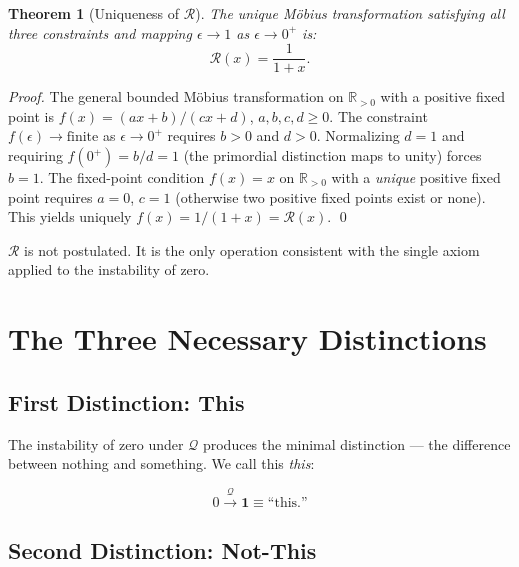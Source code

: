 \documentclass[11pt]{article}
\newtheorem{theorem}{Theorem}
\begin{document}
\begin{theorem}[Uniqueness of $\mathcal{R}$]
  The unique M\"{o}bius transformation satisfying all three constraints
  and mapping $\epsilon\to 1$ as $\epsilon\to 0^+$ is:
  \begin{equation}
    \boxed{\mathcal{R}(x) = \frac{1}{1+x}.}
  \end{equation}
\end{theorem}

\begin{proof}
  The general bounded M\"{o}bius transformation on $\mathbb{R}_{>0}$
  with a positive fixed point is $f(x)=(ax+b)/(cx+d)$,
  $a,b,c,d\geq0$. The constraint $f(\epsilon)\to\text{finite}$
  as $\epsilon\to0^+$ requires $b>0$ and $d>0$.
  Normalizing $d=1$ and requiring $f(0^+)=b/d=1$ (the primordial
  distinction maps to unity) forces $b=1$.
  The fixed-point condition $f(x)=x$ on $\mathbb{R}_{>0}$ with
  a \emph{unique} positive fixed point requires $a=0$, $c=1$
  (otherwise two positive fixed points exist or none).
  This yields uniquely $f(x)=1/(1+x)=\mathcal{R}(x)$. \qed
\end{proof}

$\mathcal{R}$ is not postulated. It is the only operation consistent
with the single axiom applied to the instability of zero.

\section{The Three Necessary Distinctions}
\label{sec:distinctions}

\subsection{First Distinction: This}

The instability of zero under $\mathcal{Q}$ produces the minimal
distinction --- the difference between nothing and something. We call
this \emph{this}:

\begin{equation}
  0 \xrightarrow{\mathcal{Q}} \mathbf{1} \equiv \text{``this.''}
\end{equation}

\subsection{Second Distinction: Not-This}
\end{document}
